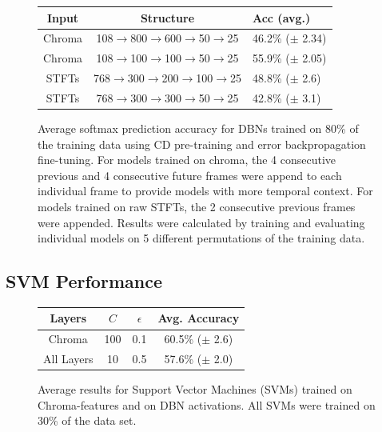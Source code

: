 \documentclass{article}
\begin{document}
\begin{figure}
  \begin{center}
\begin{tabular}{c|c|l}
Input & Structure & Acc (avg.) \\
\hline
Chroma & 108$\rightarrow$800$\rightarrow$600$\rightarrow$50$\rightarrow$25 & 46.2\% ($\pm$ 2.34) \\
Chroma & 108$\rightarrow$100$\rightarrow$100$\rightarrow$50$\rightarrow$25  & 55.9\% ($\pm$ 2.05) \\
STFTs & 768$\rightarrow$300$\rightarrow$200$\rightarrow$100$\rightarrow$25 & 48.8\% ($\pm$ 2.6) \\
STFTs & 768$\rightarrow$300$\rightarrow$300$\rightarrow$50$\rightarrow$25 & 42.8\% ($\pm$ 3.1) \\
\end{tabular}
\label{fig:dbn:softmax:2}
\end{center}

\caption{Average softmax prediction accuracy for DBNs trained on 80\% of the
  training data using CD pre-training and error backpropagation fine-tuning.
  For models trained on chroma, the 4 consecutive previous and 4 consecutive
  future frames were append to each individual frame to provide models with
more temporal context.  For models trained on raw STFTs, the 2 consecutive
previous frames were appended. Results were calculated by training and
evaluating individual models on 5 different permutations of the training data.}

\end{figure}


\subsection{SVM Performance}

\begin{figure}
  \begin{center}
  \begin{tabular}{c|c|c|c}
    Layers & $C$ & $\epsilon$ & Avg. Accuracy \\
    \hline
    Chroma & 100 & 0.1 & 60.5\% ($\pm$ 2.6) \\
    All Layers & 10 & 0.5 & 57.6\% ($\pm$ 2.0) \\
  \end{tabular}
  \end{center}
  \caption{Average results for Support Vector Machines (SVMs) trained on
    Chroma-features and on DBN activations. All SVMs were trained on 30\% of
    the data set.}
  \label{fig:svms}
\end{figure}
\end{document}
